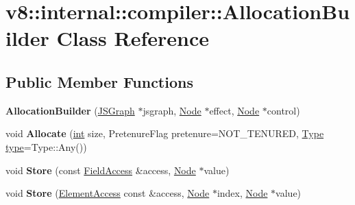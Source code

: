 \hypertarget{classv8_1_1internal_1_1compiler_1_1AllocationBuilder}{}\section{v8\+:\+:internal\+:\+:compiler\+:\+:Allocation\+Builder Class Reference}
\label{classv8_1_1internal_1_1compiler_1_1AllocationBuilder}
\subsection*{Public Member Functions}
\begin{DoxyCompactItemize}
\item 
\mbox{\label{classv8_1_1internal_1_1compiler_1_1AllocationBuilder_a63e5da0756077eefc87c4ceb968c71b9}} 
{\bfseries Allocation\+Builder} (\mbox{\hyperlink{classv8_1_1internal_1_1compiler_1_1JSGraph}{J\+S\+Graph}} $\ast$jsgraph, \mbox{\hyperlink{classv8_1_1internal_1_1compiler_1_1Node}{Node}} $\ast$effect, \mbox{\hyperlink{classv8_1_1internal_1_1compiler_1_1Node}{Node}} $\ast$control)
\item 
\mbox{\label{classv8_1_1internal_1_1compiler_1_1AllocationBuilder_af93a44e38c374dfd83787cbbb1d85cee}} 
void {\bfseries Allocate} (\mbox{\hyperlink{classint}{int}} size, Pretenure\+Flag pretenure=N\+O\+T\+\_\+\+T\+E\+N\+U\+R\+ED, \mbox{\hyperlink{classv8_1_1internal_1_1compiler_1_1Type}{Type}} \mbox{\hyperlink{classstd_1_1conditional_1_1type}{type}}=Type\+::\+Any())
\item 
\mbox{\label{classv8_1_1internal_1_1compiler_1_1AllocationBuilder_aba5aa2ad1d337a4110b33c2ac31b6da3}} 
void {\bfseries Store} (const \mbox{\hyperlink{structv8_1_1internal_1_1compiler_1_1FieldAccess}{Field\+Access}} \&access, \mbox{\hyperlink{classv8_1_1internal_1_1compiler_1_1Node}{Node}} $\ast$value)
\item 
\mbox{\label{classv8_1_1internal_1_1compiler_1_1AllocationBuilder_a9aa00a063017009e0ee51359e52d0a97}} 
void {\bfseries Store} (\mbox{\hyperlink{structv8_1_1internal_1_1compiler_1_1ElementAccess}{Element\+Access}} const \&access, \mbox{\hyperlink{classv8_1_1internal_1_1compiler_1_1Node}{Node}} $\ast$index, \mbox{\hyperlink{classv8_1_1internal_1_1compiler_1_1Node}{Node}} $\ast$value)

\end{DoxyCompactItemize}
